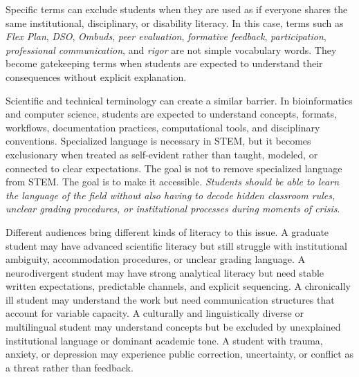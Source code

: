 \documentclass[11pt]{article}
\begin{document}

Specific terms can exclude students when they are used as if everyone shares the same institutional, disciplinary, or disability literacy. In this case, terms such as \textit{Flex Plan}, \textit{DSO}, \textit{Ombuds}, \textit{peer evaluation}, \textit{formative feedback}, \textit{participation}, \textit{professional communication}, and \textit{rigor} are not simple vocabulary words. They become gatekeeping terms when students are expected to understand their consequences without explicit explanation.

Scientific and technical terminology can create a similar barrier. In bioinformatics and computer science, students are expected to understand concepts, formats, workflows, documentation practices, computational tools, and disciplinary conventions. Specialized language is necessary in STEM, but it becomes exclusionary when treated as self-evident rather than taught, modeled, or connected to clear expectations. The goal is not to remove specialized language from STEM. The goal is to make it accessible. \textit{Students should be able to learn the language of the field without also having to decode hidden classroom rules, unclear grading procedures, or institutional processes during moments of crisis}.


Different audiences bring different kinds of literacy to this issue. A graduate student may have advanced scientific literacy but still struggle with institutional ambiguity, accommodation procedures, or unclear grading language. A neurodivergent student may have strong analytical literacy but need stable written expectations, predictable channels, and explicit sequencing. A chronically ill student may understand the work but need communication structures that account for variable capacity. A culturally and linguistically diverse or multilingual student may understand concepts but be excluded by unexplained institutional language or dominant academic tone. A student with trauma, anxiety, or depression may experience public correction, uncertainty, or conflict as a threat rather than feedback.
\end{document}
